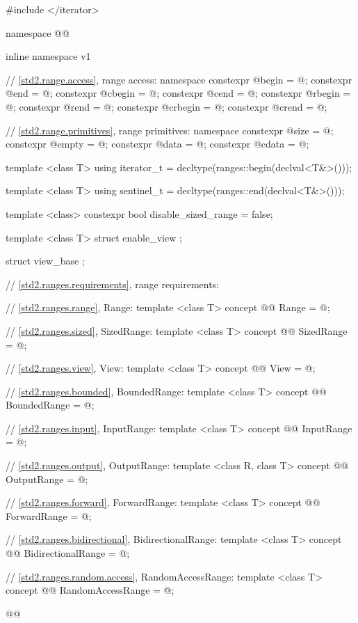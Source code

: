 %
\begin{codeblock}
#include </iterator>

namespace @@ { inline namespace v1 {
  // \ref{std2.range.access}, range access:
  namespace {
    constexpr @\unspec@ begin = @\unspec@;
    constexpr @\unspec@ end = @\unspec@;
    constexpr @\unspec@ cbegin = @\unspec@;
    constexpr @\unspec@ cend = @\unspec@;
    constexpr @\unspec@ rbegin = @\unspec@;
    constexpr @\unspec@ rend = @\unspec@;
    constexpr @\unspec@ crbegin = @\unspec@;
    constexpr @\unspec@ crend = @\unspec@;
  }

  // \ref{std2.range.primitives}, range primitives:
  namespace {
    constexpr @\unspec@ size = @\unspec@;
    constexpr @\unspec@ empty = @\unspec@;
    constexpr @\unspec@ data = @\unspec@;
    constexpr @\unspec@ cdata = @\unspec@;
  }

  template <class T>
  using iterator_t = decltype(ranges::begin(declval<T&>()));

  template <class T>
  using sentinel_t = decltype(ranges::end(declval<T&>()));

  template <class>
  constexpr bool disable_sized_range = false;

  template <class T>
  struct enable_view { };

  struct view_base { };

  // \ref{std2.ranges.requirements}, range requirements:

  // \ref{std2.ranges.range}, Range:
  template <class T>
  concept @@ Range = @\seebelow@;

  // \ref{std2.ranges.sized}, SizedRange:
  template <class T>
  concept @@ SizedRange = @\seebelow@;

  // \ref{std2.ranges.view}, View:
  template <class T>
  concept @@ View = @\seebelow@;

  // \ref{std2.ranges.bounded}, BoundedRange:
  template <class T>
  concept @@ BoundedRange = @\seebelow@;

  // \ref{std2.ranges.input}, InputRange:
  template <class T>
  concept @@ InputRange = @\seebelow@;

  // \ref{std2.ranges.output}, OutputRange:
  template <class R, class T>
  concept @@ OutputRange = @\seebelow@;

  // \ref{std2.ranges.forward}, ForwardRange:
  template <class T>
  concept @@ ForwardRange = @\seebelow@;

  // \ref{std2.ranges.bidirectional}, BidirectionalRange:
  template <class T>
  concept @@ BidirectionalRange = @\seebelow@;

  // \ref{std2.ranges.random.access}, RandomAccessRange:
  template <class T>
  concept @@ RandomAccessRange = @\seebelow@;
}}@\removed{\}\}}@
\end{codeblock}

